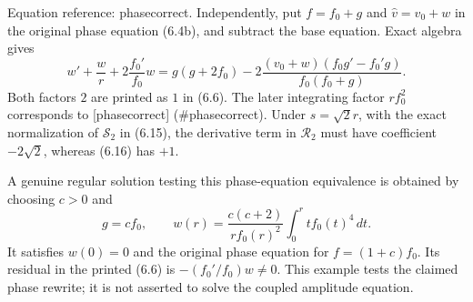 \documentclass[10pt]{article}
\begin{document}
Equation reference: phasecorrect. Independently, put \(f=f_0+g\) and \(\widehat v=v_0+w\) in the original phase equation (6.4b), and subtract the base equation. Exact algebra gives \[
 w'+\frac wr+2\frac{f_0'}{f_0}w
 =g(g+2f_0)
 -2\frac{(v_0+w)(f_0g'-f_0'g)}{f_0(f_0+g)}.\] Both factors \(2\) are printed as \(1\) in (6.6). The later integrating factor \(rf_0^2\) corresponds to [phasecorrect] (\#phasecorrect). Under \(s=\sqrt2r\), with the exact normalization of \(\mathcal{S}_2\) in (6.15), the derivative term in \(\mathcal{R}_2\) must have coefficient \(-2\sqrt2\), whereas (6.16) has \(+1\).\par
A genuine regular solution testing this phase-equation equivalence is obtained by choosing \(c>0\) and \[g=cf_0,\qquad
 w(r)=\frac{c(c+2)}{rf_0(r)^2}
                    \int_0^r t f_0(t)^4\,dt.\] It satisfies \(w(0)=0\) and the original phase equation for \(f=(1+c)f_0\). Its residual in the printed (6.6) is \(-(f_0'/f_0)w\ne0\). This example tests the claimed phase rewrite; it is not asserted to solve the coupled amplitude equation.\par
\end{document}
